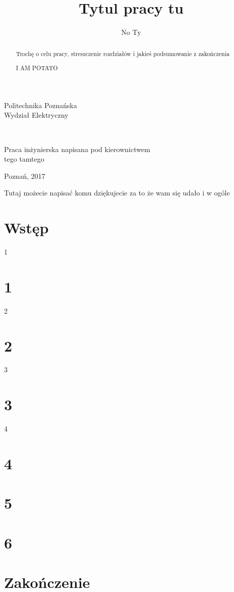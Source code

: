 \documentclass[12pt,a4paper,twoside]{report}
\author{No Ty}
\title{Tytul pracy tu}
\makeatletter
\renewcommand{\maketitle}{\begin{titlepage}
    \vspace*{1cm}
    \begin{center}
    	Politechnika Poznańska\\
    	Wydział Elektryczny\\
    \end{center}
    \vspace{3cm}

    \begin{center}
     \LARGE\textbf{\textsc{\@title}}\\
      \Large\textsc{\@author}
    \end{center}
    \vspace{0.5cm}
    \begin{flushright}

    \vspace{9cm}
     {\small Praca inżynierska
napisana pod kierownictwem}\\
         tego tamtego 
     \end{flushright}
    \vspace*{\stretch{6}}
    \begin{center}
    Poznań, 2017
    \end{center}
  \end{titlepage}%
}
\makeatother
\begin{document}
	\maketitle

      \newpage
    \begin{minipage}{6cm} \hfill
  \end{minipage}  
  \begin{minipage}{9cm}
    \vspace{18.5cm}
    {  \selectfont Tutaj możecie napisać komu dziękujecie za to że wam się udało i w ogóle}
  \thispagestyle{empty}
  \end{minipage}
  \begin{abstract}
    Trochę o celu pracy, streszczenie rozdziałów i jakieś podsumowanie z zakończenia
  \end{abstract}

  \renewcommand{\abstractname}{Abstract}
  \begin{abstract}
  I AM POTATO 
  \end{abstract}
	\tableofcontents
	\pagestyle{plain}
	\chapter*{Wstęp}
		{1}
	\chapter{1}
		{2}
	\chapter{2}
		{3}
	\chapter{3}
		{4}
	\chapter{4}
	\chapter{5}
	\chapter{6}
	\chapter*{Zakończenie}
\end{document}
